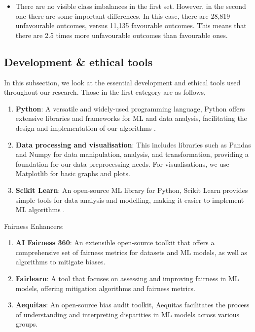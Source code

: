 \documentclass[fleqn,10pt]{wlscirep}
\begin{document}
\begin{itemize}
        \item There are no visible class imbalances in the first set. However, in the second one there are some important differences. In this case, there are 28,819 unfavourable outcomes, versus 11,135 favourable outcomes. This means that there are 2.5 times more unfavourable outcomes than favourable ones.
        
    \end{itemize}

\subsection{Development \& ethical tools}

In this subsection, we look at the essential development and ethical tools used throughout our research. Those in the first category are as follows,

\begin{enumerate}
    \item \textbf{Python}: A versatile and widely-used programming language, Python offers extensive libraries and frameworks for ML and data analysis, facilitating the design and implementation of our algorithms \cite{10.5555/1593511}.
    
    \item \textbf{Data processing and visualisation}: This includes libraries such as Pandas \cite{reback2020pandas} and Numpy \cite{harris2020array} for data manipulation, analysis, and transformation, providing a foundation for our data preprocessing needs. For visualisations, we use Matplotlib \cite{Hunter:2007} for basic graphs and plots.

    \item \textbf{Scikit Learn}: An open-source ML library for Python, Scikit Learn provides simple tools for data analysis and modelling, making it easier to implement ML algorithms \cite{scikit-learn}.
\end{enumerate}

Fairness Enhancers:

\begin{enumerate}
    
    \item \textbf{AI Fairness 360}: An extensible open-source toolkit that offers a comprehensive set of fairness metrics for datasets and ML models, as well as algorithms to mitigate biases.
    
    \item \textbf{Fairlearn}: A tool that focuses on assessing and improving fairness in ML models, offering mitigation algorithms and fairness metrics.

    \item \textbf{Aequitas}: An open-source bias audit toolkit, Aequitas facilitates the process of understanding and interpreting disparities in ML models across various groups.
\end{enumerate}
\end{document}
